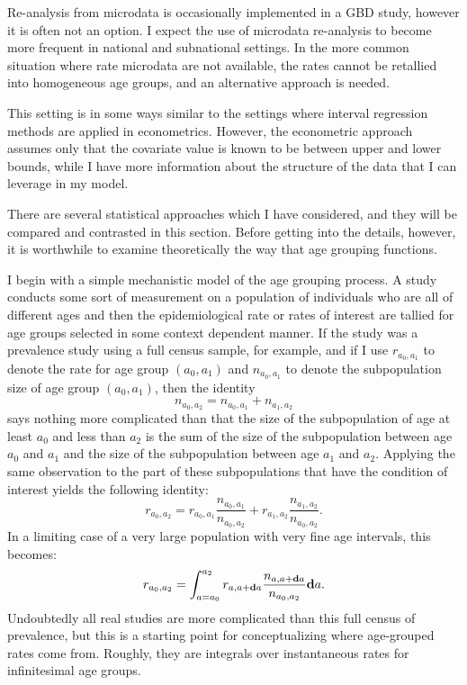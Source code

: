 Re-analysis from microdata is occasionally implemented in a GBD study,
however it is often not an option.  I expect the use of microdata
re-analysis to become more frequent in national and subnational
settings.  In the more common situation where rate microdata are not
available, the rates cannot be retallied into homogeneous age groups,
and an alternative approach is needed.

This setting is in some ways similar to the settings where interval
regression methods are applied in econometrics.\cite{refs_TK} However,
the econometric approach assumes only that the covariate value is
known to be between upper and lower bounds, while I have more
information about the structure of the data that I can leverage in my
model.

There are several statistical approaches which I have considered, and
they will be compared and contrasted in this section.  Before getting
into the details, however, it is worthwhile to examine theoretically
the way that age grouping functions.

I begin with a simple mechanistic model of the age grouping process.
A study conducts some sort of measurement on a population of
individuals who are all of different ages and then the
epidemiological rate or rates of interest are tallied for age groups
selected in some context dependent manner. If the study was a
prevalence study using a full census sample, for example, and if I use
$r_{a_0,a_1}$ to denote the rate for age group $(a_0, a_1)$ and
$n_{a_0,a_1}$ to denote the subpopulation size of age group
$(a_0,a_1)$, then the identity
\[
n_{a_0, a_2} = n_{a_0,a_1} + n_{a_1,a_2}
\]
says nothing more complicated than that the size of the subpopulation
of age at least $a_0$ and less than $a_2$ is the sum of the size of
the subpopulation between age $a_0$ and $a_1$ and the size of the
subpopulation between age $a_1$ and $a_2$.  Applying the same
observation to the part of these subpopulations that have the condition
of interest yields the following identity:
\[
r_{a_0,a_2} = r_{a_0,a_1}\frac{n_{a_0,a_1}}{n_{a_0,a_2}} + r_{a_1,a_2}\frac{n_{a_1,a_2}}{n_{a_0,a_2}}. 
\] 
In a limiting case of a very large population with very fine age
intervals, this becomes:
\[
r_{a_0,a_2} = \int_{a=a_0}^{a_2} r_{a,a+\mathbf{d} a}\frac{n_{a,a+\mathbf{d} a}}{n_{a_0,a_2}}\mathbf{d} a.
\]
Undoubtedly all real studies are more complicated than this full
census of prevalence, but this is a starting point for conceptualizing
where age-grouped rates come from.  Roughly, they are integrals over
instantaneous rates for infinitesimal age groups.


